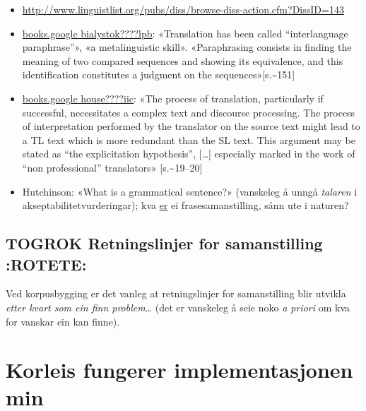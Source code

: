 \documentclass[11pt,a4paper,oneside,draft]{book}
\begin{document}
\begin{itemize}
\item \href{http://www.linguistlist.org/pubs/diss/browse-diss-action.cfm?DissID=143}{http://www.linguistlist.org/pubs/diss/browse-diss-action.cfm?DissID=143}
\item \href{http://books.google.com/books%3Fhl%3Dno&lr%3D&ie%3DUTF-8&id%3DhHFoJguRE4oC&oi%3Dfnd&pg%3DPA141&dq%3Dprocessing%2Btranslation%2Bpsycholinguistic%2Bsyntax&ots%3DNUlz1ebVnE&sig%3DrkMwuX59RoIikvTYGq23HNkYtzc}{books.google bialystok????lpb}: «Translation has been called
  ``interlanguage paraphrase''», «a metalinguistic skill». «Paraphrasing
  consists in finding the meaning of two compared sequences and
  showing its equivalence, and this identification constitutes a
  judgment on the sequences»[s.\~{}151]
\item \href{http://books.google.com/books%3Fhl%3Dno&lr%3D&ie%3DUTF-8&id%3DCZXcTzFLDuwC&oi%3Dfnd&pg%3DPA17&dq%3Dprocessing%2Btranslation%2Bpsycholinguistic%2Bsyntax&ots%3DFUm_X5VCeu&sig%3DNoHLNrNxq7bGNAcsRda8RWNDyOY}{books.google house????iic}: «The process of translation, particularly
  if successful, necessitates a complex text and discourse
  processing. The process of interpretation performed by the
  translator on the source text might lead to a TL text which is more
  redundant than the SL text. This argument may be stated as ``the
  explicitation hypothesis'', [\ldots{}] especially marked in the work of
  ``non professional'' translators» [s.\~{}19--20]
\item Hutchinson: «What is a grammatical sentence?» (vanskeleg å unngå
  \emph{talaren} i akseptabilitetvurderingar); kva \underline{er} ei frasesamanstilling,
  sånn ute i naturen?
\end{itemize}
\section{\textbf{TOGROK} Retningslinjer for samanstilling \textbf{:ROTETE:}}
\label{sec-3.24}

Ved korpusbygging er det vanleg at retningslinjer for samanstilling
blir utvikla \emph{etter kvart som ein finn problem}\ldots{} (det er vanskeleg å
seie noko \emph{a priori} om kva for vanskar ein kan finne).



\chapter{Korleis fungerer implementasjonen min}
\label{sec-4}
\end{document}
